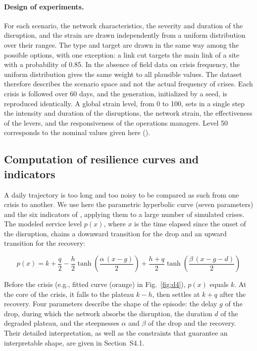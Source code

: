 \paragraph{Design of experiments.} For each scenario, the network characteristics, the severity and duration of the disruption, and the strain are drawn independently from a uniform distribution over their ranges. The type and target are drawn in the same way among the possible options, with one exception: a link cut targets the main link of a site with a probability of 0.85. In the absence of field data on crisis frequency, the uniform distribution gives the same weight to all plausible values. The dataset therefore describes the scenario space and not the actual frequency of crises. Each crisis is followed over 60 days, and the generation, initialized by a seed, is reproduced identically. A global strain level, from 0 to 100, sets in a single step the intensity and duration of the disruptions, the network strain, the effectiveness of the levers, and the responsiveness of the operations managers. Level 50 corresponds to the nominal values given here ().

\subsection{Computation of resilience curves and indicators}
\label{sec:3.3}

A daily trajectory is too long and too noisy to be compared as such from one crisis to another. We use here the parametric hyperbolic curve (seven parameters) and the six indicators of \citet{rahiel2026in4pl}, applying them to a large number of simulated crises. The modeled service level $p(x)$, where $x$ is the time elapsed since the onset of the disruption, chains a downward transition for the drop and an upward transition for the recovery:

\begin{equation}
p(x) = k + \frac{q}{2} - \frac{h}{2}\tanh\left(\frac{\alpha\,(x - g)}{2}\right) + \frac{h + q}{2}\tanh\left(\frac{\beta\,(x - g - d)}{2}\right)
\label{eq:5}
\end{equation}

Before the crisis (e.g., fitted curve (orange) in Fig.~\ref{fig:d4}), $p(x)$ equals $k$. At the core of the crisis, it falls to the plateau $k - h$, then settles at $k + q$ after the recovery. Four parameters describe the shape of the episode: the delay $g$ of the drop, during which the network absorbs the disruption, the duration $d$ of the degraded plateau, and the steepnesses $\alpha$ and $\beta$ of the drop and the recovery. Their detailed interpretation, as well as the constraints that guarantee an interpretable shape, are given in Section~S4.1.

